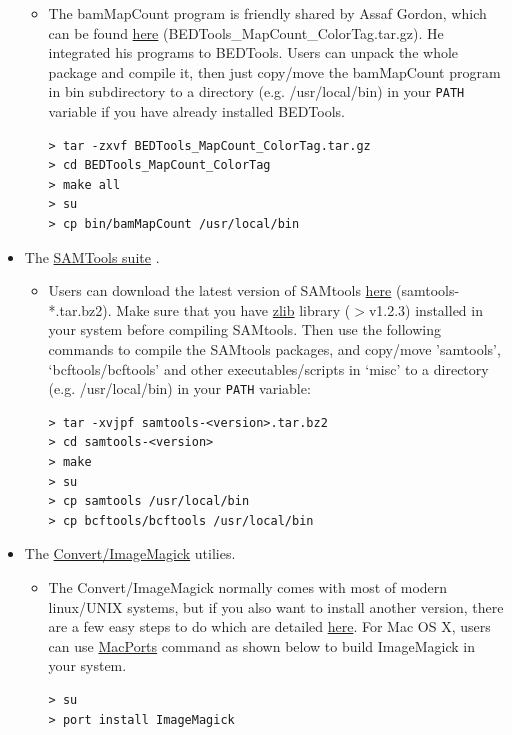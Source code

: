 \documentclass[12pt]{article}
\begin{document}
\begin{itemize}
\begin{itemize}
 \item The bamMapCount program is friendly shared by Assaf Gordon, which can be found \href{http://xfer.curie.fr/get/2Rpz9IfJKcZ/BEDTools\_MapCount\_ColorTag.tar.gz}{ here} (BEDTools\_MapCount\_ColorTag.tar.gz). He integrated his programs to BEDTools. Users can unpack the whole package and compile it, then just copy/move the bamMapCount program in bin subdirectory to a directory (e.g. /usr/local/bin) in your \verb+PATH+ variable if you have already installed BEDTools.
\begin{verbatim}
> tar -zxvf BEDTools_MapCount_ColorTag.tar.gz
> cd BEDTools_MapCount_ColorTag
> make all
> su
> cp bin/bamMapCount /usr/local/bin
\end{verbatim}
\end{itemize}

 \item The \href{http://samtools.sourceforge.net/}{ SAMTools suite} \cite{Li2009}.

\begin{itemize}
 \item Users can download the latest version of SAMtools \href{http://sourceforge.net/projects/samtools/files/latest/download?source=files}{ here} (samtools-*.tar.bz2). Make sure that you have \href{http://www.zlib.net}{ zlib} library ($>$v1.2.3) installed in your system before compiling SAMtools. Then use the following commands to compile the SAMtools packages, and copy/move 'samtools', `bcftools/bcftools' and other executables/scripts in `misc' to a directory (e.g. /usr/local/bin) in your \verb+PATH+ variable: 
\begin{verbatim}
> tar -xvjpf samtools-<version>.tar.bz2
> cd samtools-<version>
> make
> su
> cp samtools /usr/local/bin
> cp bcftools/bcftools /usr/local/bin
\end{verbatim} 
\end{itemize}

 \item The \href{http://www.imagemagick.org/script/index.php}{ Convert/ImageMagick} utilies.

\begin{itemize}
 \item The Convert/ImageMagick normally comes with most of modern linux/UNIX systems, but if you also want to install another version, there are a few easy steps to do which are detailed \href{http://www.imagemagick.org/script/install-source.php#unix}{ here}. For Mac OS X, users can use \href{http://www.macports.org/}{ MacPorts} command as shown below to build ImageMagick in your system.
\begin{verbatim}
> su
> port install ImageMagick 
\end{verbatim}
\end{itemize}


\end{itemize}
\end{document}
